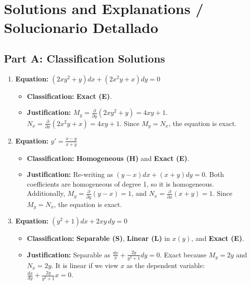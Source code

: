 \documentclass[11pt,letterpaper]{article}
\begin{document}
\newpage
\section{Solutions and Explanations / Solucionario Detallado}

\subsection*{Part A: Classification Solutions}

\begin{enumerate}[label=\textbf{\arabic*.}]
    \item \textbf{Equation:} $(2xy^2 + y)dx + (2x^2y + x)dy = 0$
    \begin{itemize}
        \item \textbf{Classification:} \textbf{Exact (E)}.
        \item \textbf{Justification:} $M_y = \frac{\partial}{\partial y}(2xy^2 + y) = 4xy + 1$. $N_x = \frac{\partial}{\partial x}(2x^2y + x) = 4xy + 1$. Since $M_y = N_x$, the equation is exact.
    \end{itemize}

    \item \textbf{Equation:} $y' = \frac{x-y}{x+y}$
    \begin{itemize}
        \item \textbf{Classification:} \textbf{Homogeneous (H)} and \textbf{Exact (E)}.
        \item \textbf{Justification:} Re-writing as $(y-x)dx + (x+y)dy = 0$. Both coefficients are homogeneous of degree 1, so it is homogeneous. Additionally, $M_y = \frac{\partial}{\partial y}(y-x) = 1$, and $N_x = \frac{\partial}{\partial x}(x+y) = 1$. Since $M_y = N_x$, the equation is exact.
    \end{itemize}

    \item \textbf{Equation:} $(y^2 + 1)dx + 2xy\,dy = 0$
    \begin{itemize}
        \item \textbf{Classification:} \textbf{Separable (S)}, \textbf{Linear (L)} in $x(y)$, and \textbf{Exact (E)}.
        \item \textbf{Justification:} Separable as $\frac{dx}{x} + \frac{2y}{y^2+1}dy = 0$. Exact because $M_y = 2y$ and $N_x = 2y$. It is linear if we view $x$ as the dependent variable: $\frac{dx}{dy} + \frac{2y}{y^2+1}x = 0$.
    \end{itemize}


\end{enumerate}
\end{document}
